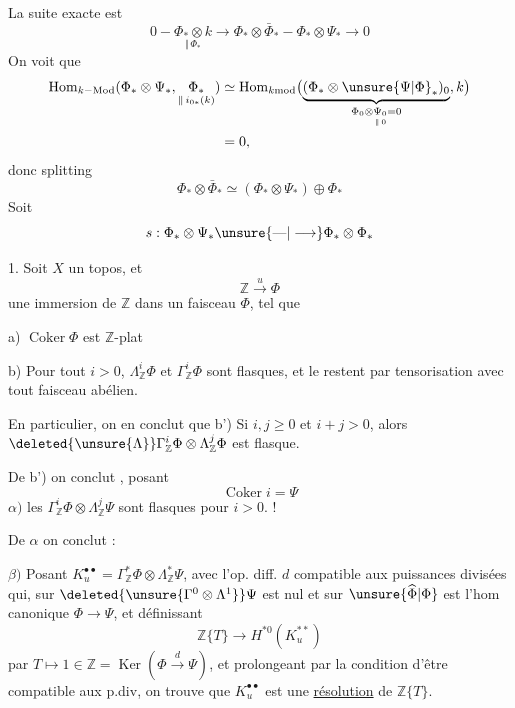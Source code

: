 La suite exacte est
\[
0-\underset{\Vert\,\Phi_*}{\Phi_*\otimes k}
\longrightarrow\Phi_*\otimes\bar\Phi_*-\Phi_*\otimes\Psi_*\longrightarrow0
\]
On voit que
\[
\begin{aligned}
\operatorname{Hom}_{k-\mathrm{Mod}}(\Phi_*\otimes\Psi_*,
\underset{\Vert\,i_{0*}(k)}{\Phi_*})
&\simeq\operatorname{Hom}_{k\mathrm{mod}}
\bigl(\underbrace{(\Phi_*\otimes\unsure{\Psi|\Phi}_*)_0}_{\Phi_0\otimes\underset{\Vert\,0}{\Psi_0}=0},k\bigr)\\
&=0,
\end{aligned}
\]
donc splitting 
\[
\Phi_*\otimes\bar\Phi_*\simeq(\Phi_*\otimes\Psi_*)\oplus\Phi_*
\]
Soit 
\[
s:\Phi_*\otimes\Psi_*\unsure{\text{---}|\longrightarrow}\Phi_*\otimes\Phi_*
\]

1. Soit $X$ un topos, et
\[
\mathbb Z\xrightarrow{u}\Phi
\]
une immersion de $\mathbb Z$ dans un faisceau $\Phi$, tel que

a) $\operatorname{Coker}\Phi$ est $\mathbb Z$-plat

b) Pour tout $i>0$, $\Lambda_{\mathbb Z}^i\Phi$ et $\Gamma_{\mathbb Z}^i\Phi$ sont flasques, et le restent par tensorisation avec tout faisceau abélien.

En particulier, on en conclut  que 
b') Si $i,j\geq0$ et $i+j>0$, alors $\deleted{\unsure{\Lambda}}\Gamma_{\mathbb Z}^i\Phi\otimes\Lambda_{\mathbb Z}^j\Phi$ est flasque.

De b') on conclut , posant
\[
\operatorname{Coker}i=\Psi
\]
$\alpha)$ les $\Gamma_{\mathbb Z}^i\Phi\otimes\Lambda_{\mathbb Z}^j\Psi$ sont flasques pour $i>0$. !

De $\alpha$ on conclut :

$\beta)$ Posant $K_u^{\bullet\bullet}=\Gamma_{\mathbb Z}^*\Phi\otimes\Lambda_{\mathbb Z}^*\Psi$,
avec l'op. diff.  $d$ compatible aux puissances divisées qui,
sur $\deleted{\unsure{\Gamma^0\otimes\Lambda^1}}\Psi$ est nul et sur $\unsure{\widehat\Phi|\Phi}$ est l'hom canonique $\Phi\longrightarrow\Psi$, et définissant
\[
\mathbb Z\{T\}\longrightarrow H^{*0}(K_u^{**})
\]
par $T\longmapsto1\in\mathbb Z=\operatorname{Ker}(\Phi\xrightarrow{d}\Psi)$,
et prolongeant par la condition d'être compatible aux p.div,
on trouve que $K_u^{\bullet\bullet}$ est une \uline{résolution} de $\mathbb Z\{T\}$.

